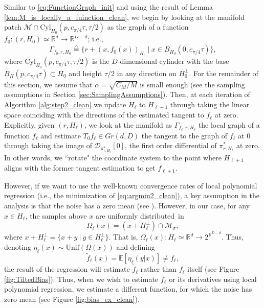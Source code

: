 \documentclass[12pt]{article}
\theoremstyle{remark}
\newcommand{\RR}{\mathbb{R}}
\newcommand{\MM}{\mathcal{M}}
\newcommand{\DD}{\mathcal{D}}
\newcommand{\defeq}{\stackrel{\bigtriangleup}{=}}
\newcommand{\wtilde}[1]{\widetilde{#1}}
\newcommand{\sM}{{M}}
\begin{document}
Similar to \eqref{eq:FunctionGraph_init} and using the result of Lemma \ref{lem:M_is_locally_a_fuinction_clean}, we begin by looking at the manifold patch $\MM \cap \textrm{Cyl}_{H_0}(p,c_{\pi/4}\tau,\tau/2)$ as the graph of a function $f_{0}:(r,H_0) \simeq\RR^d\to\RR^{D-d}$; i.e., 
\begin{equation}
	\Gamma_{f_{0}, r,H_0} \defeq \{r + (x, f_{0}(x))_{H_0} ~|~ x\in B_{H_0}(0, c_{\pi/4}\tau)\}  
	,\end{equation}
where $\textrm{Cyl}_{H_0}(p,c_{\pi/4}\tau, \tau/2)$ is the $D$-dimensional cylinder with the base $B_H(p, c_{\pi/4}\tau)\subset H_0$ and height $\tau/2$ in any direction on $H_0^\perp$. 
For the remainder of this section, we assume that $ \alpha = \sqrt{C_\sM/M} $ is small enough (see the sampling assumptions in Section \ref{sec:SamplingAssumptions}).
Then, at each iteration of Algorithm \ref{alg:step2_clean} we update $H_\ell$ to $H_{\ell + 1}$ through taking the linear space coinciding with the directions of the estimated tangent to $f_{\ell}$ at zero. 
Explicitly, given $(r, H_{\ell})$, we look at the manifold as $\Gamma_{f_{\ell}, r, H_{\ell}}$ the local graph of a function $f_{\ell}$ and estimate $T_0 f_{\ell} \in Gr(d, D)$ the tangent to the graph of $f_{\ell}$ at $0$ through taking the image of $\DD_{\pi^*_{r, H_{\ell}}}[0]$, the first order differential of $\pi^*_{r, H_{\ell }}$ at zero.
In other words, we ``rotate" the coordinate system to the point where $H_{\ell+1}$ aligns with the former tangent estimation to get $f_{\ell+1}$. 

However, if we want to use the well-known convergence rates of local polynomial regression (i.e., the minimization of \eqref{eq:argmin2_clean}), a key assumption in the analysis is that the noise has a zero mean (see \cite{stone1980optimal}). 
However, in our case, for any $x\in H_\ell$, the samples above $x$ are uniformly distributed~in 
\begin{equation}\label{eq:Omega_def}
	\Omega_\ell(x) = (x + H_\ell^\perp) \cap  \MM_\sigma
	,\end{equation}
where $x + H_\ell^\perp = \{x + y ~|~ y\in H_\ell^\perp\}$.
That is, $\Omega_\ell(x):H_\ell \simeq \RR^d \to 2^{\RR^{D-d}}$.
Thus, denoting $\eta_\ell(x)\sim \textrm{Unif}(\Omega(x))$ and defining 
\begin{equation}\label{eq:ftilde_def}
	\wtilde f_\ell(x) = \mathbb{E}[\eta_\ell(y | x)]     \neq f_\ell
	,\end{equation}
the result of the regression will estimate $\wtilde f_\ell$ rather than $f_\ell$ itself  (see Figure \ref{fig:TiltedBias}). Thus, when we wish to estimate $f_\ell$ or its derivatives using local polynomial regression, we estimate a different function, for which the noise has zero mean (see Figure \ref{fig:bias_ex_clean}).
\end{document}
